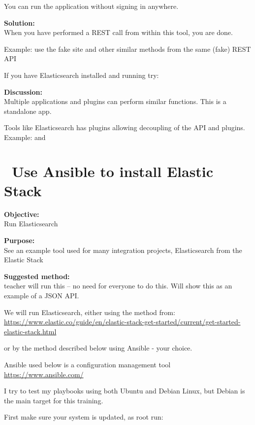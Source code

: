 \documentclass[a4paper,11pt,notitlepage]{report}
\begin{document}
You can run the application without signing in anywhere.

{\bf Solution:}\\
When you have performed a REST call from within this tool, you are done.

Example: use the fake site  and other similar methods from the same (fake) REST API

If you have Elasticsearch installed and running try: 

{\bf Discussion:}\\
Multiple applications and plugins can perform similar functions. This is a standalone app.

Tools like Elasticsearch has plugins allowing decoupling of the API and plugins. Example:  and 



\chapter{\faInfoCircle\ Use Ansible to install Elastic Stack}
\label{ex:basicansible}


{\bf Objective:}\\
Run Elasticsearch

{\bf Purpose:}\\
See an example tool used for many integration projects, Elasticsearch from the Elastic Stack

{\bf Suggested method:}\\

{\large teacher will run this -- no need for everyone to do this. Will show this as an example of a JSON API.}

We will run Elasticsearch, either using the method from:\\{\footnotesize
\url{https://www.elastic.co/guide/en/elastic-stack-get-started/current/get-started-elastic-stack.html}}

or by the method described below using Ansible - your choice.

Ansible used below is a configuration management tool \url{https://www.ansible.com/}

I try to test my playbooks using both Ubuntu and Debian Linux, but Debian is the main target for this training.

First make sure your system is updated, as root run:
\end{document}
